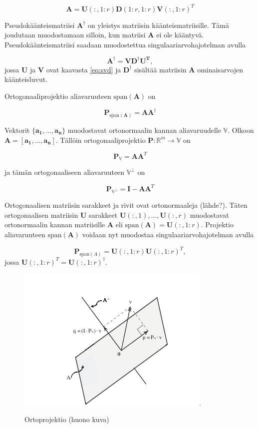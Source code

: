\begin{equation}
    \mathbf{A} = \mathbf{U}(:,1:r)\mathbf{D}(1:r,1:r)\mathbf{V}(:,1:r)^T
    \label{eq:2}
\end{equation}


Pseudokäänteismatriisi $\mathbf{A^{\dagger}}$ on yleistys matriisin käänteismatriisille. Tämä joudutaan muodostamaan silloin, kun matriisi $\mathbf{A}$ ei ole kääntyvä. Pseudokäänteismatriisi saadaan muodostettua singulaariarvohajotelman avulla

\begin{equation}
    \mathbf{A^{\dagger} = VD^{\dagger}U^T},
\end{equation}
jossa \textbf{U} ja \textbf{V} ovat kaavasta \ref{eq:svd} ja $\mathbf{D}^{\dagger}$ sisältää matriisin \textbf{A} ominaisarvojen käänteisluvut.

Ortogonaaliprojektio aliavaruuteen $\text{span}(\mathbf{A})$ on 

\begin{equation}
    \mathbf{P}_{\text{span}(\mathbf{A})}= \mathbf{AA}^{\dagger}
\end{equation}

Vektorit $\{\mathbf{a_1,...,a_n}\}$ muodostavat ortonormaalin kannan aliavaruudelle $\mathbb{V}$. Olkoon $\mathbf{A = [\mathbf{a_1,...,a_n}]}$. Tällöin ortogonaaliprojektio $\mathbf{P}: \mathbb{R}^m \to \mathbb{V}$ on

\begin{equation}
    \mathbf{P}_{\mathbb{V}} = \mathbf{AA}^T
\end{equation}

ja tämän ortogonaaliseen aliavaruuteen $\mathbb{V}^{\bot}$ on

\begin{equation}
    \mathbf{P}_{\mathbb{V}^{\bot}}=\mathbf{I}-\mathbf{AA}^T
\end{equation}

Ortogonaalisen matriisin sarakkeet ja rivit ovat ortonormaaleja (lähde?). Täten ortogonaalisen matriisin \textbf{U} sarakkeet $\mathbf{U}(:,1),...,\mathbf{U}(:,r)$ muodostavat ortonormaalin kannan matriisille \textbf{A} eli $\text{span}(\mathbf{A}) = \mathbf{U}(:,1:r)$. Projektio aliavaruuteen $\text{span}(\mathbf{A})$ voidaan nyt muodostaa singulaariarvohajotelman avulla

\begin{equation}
    \mathbf{P}_{\text{span}(A)} = \mathbf{U}(:,1:r)\mathbf{U}(:,1:r)^T,
    \label{eq:6}
\end{equation}
jossa $\mathbf{U}(:,1:r)^T = \mathbf{U}(:,1:r)^{\dagger}$.

\begin{figure}[h]
    \centering
    \includegraphics[width=.7\textwidth]{ortoprojektio.png}.
    \caption{Ortoprojektio (huono kuva)}
\end{figure}